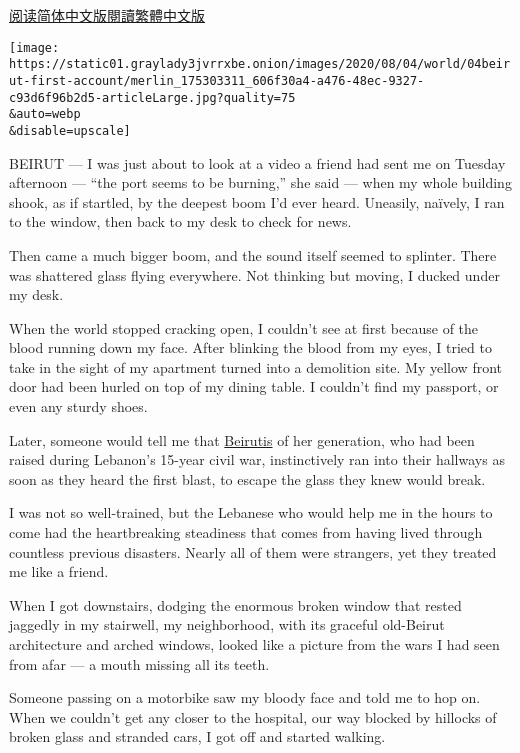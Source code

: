 \href{https://cn.nytimes3xbfgragh.onion/world/20200805/beirut-explosion-first-person/}{阅读简体中文版}\href{https://cn.nytimes3xbfgragh.onion/world/20200805/beirut-explosion-first-person/zh-hant/}{閱讀繁體中文版}

\texttt{[image: https://static01.graylady3jvrrxbe.onion/images/2020/08/04/world/04beirut-first-account/merlin\_175303311\_606f30a4-a476-48ec-9327-c93d6f96b2d5-articleLarge.jpg?quality=75\\\&auto=webp\\\&disable=upscale]}

BEIRUT --- I was just about to look at a video a friend had sent me on
Tuesday afternoon --- ``the port seems to be burning,'' she said ---
when my whole building shook, as if startled, by the deepest boom I'd
ever heard. Uneasily, naïvely, I ran to the window, then back to my desk
to check for news.

Then came a much bigger boom, and the sound itself seemed to splinter.
There was shattered glass flying everywhere. Not thinking but moving, I
ducked under my desk.

When the world stopped cracking open, I couldn't see at first because of
the blood running down my face. After blinking the blood from my eyes, I
tried to take in the sight of my apartment turned into a demolition
site. My yellow front door had been hurled on top of my dining table. I
couldn't find my passport, or even any sturdy shoes.

Later, someone would tell me that
\href{https://www.nytimes3xbfgragh.onion/2020/08/04/world/middleeast/lebanon-explosion-beirut.html}{Beirutis}
of her generation, who had been raised during Lebanon's 15-year civil
war, instinctively ran into their hallways as soon as they heard the
first blast, to escape the glass they knew would break.

I was not so well-trained, but the Lebanese who would help me in the
hours to come had the heartbreaking steadiness that comes from having
lived through countless previous disasters. Nearly all of them were
strangers, yet they treated me like a friend.

When I got downstairs, dodging the enormous broken window that rested
jaggedly in my stairwell, my neighborhood, with its graceful old-Beirut
architecture and arched windows, looked like a picture from the wars I
had seen from afar --- a mouth missing all its teeth.

Someone passing on a motorbike saw my bloody face and told me to hop on.
When we couldn't get any closer to the hospital, our way blocked by
hillocks of broken glass and stranded cars, I got off and started
walking.

